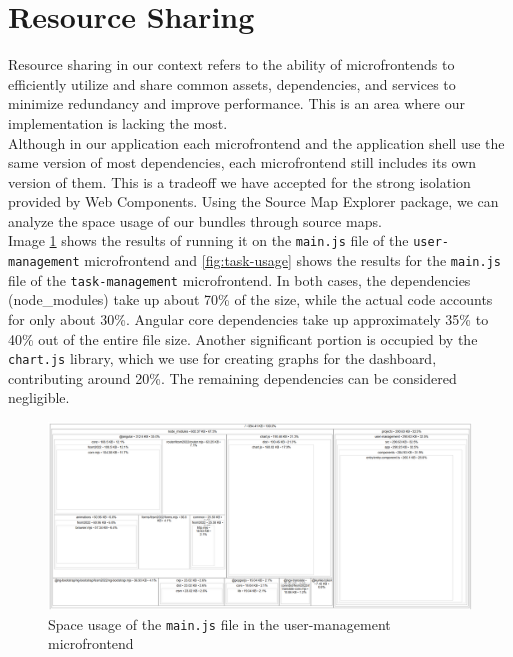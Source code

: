 \section{Resource Sharing}
Resource sharing in our context refers to the ability of microfrontends to efficiently utilize and share common assets, dependencies, and services to minimize redundancy and improve performance. This is an area where our implementation is lacking the most. \\

\noindent
Although in our application each microfrontend and the application shell use the same version of most dependencies, each microfrontend still includes its own version of them. This is a tradeoff we have accepted for the strong isolation provided by Web Components. Using the Source Map Explorer package, we can analyze the space usage of our bundles through source maps. \\

\noindent
Image \ref{fig:user-usage} shows the results of running it on the \texttt{main.js} file of the \texttt{user-management} microfrontend and \ref{fig:task-usage} shows the results for the \texttt{main.js} file of the \texttt{task-management} microfrontend. In both cases, the dependencies (node\_modules) take up about 70\% of the size, while the actual code accounts for only about 30\%. Angular core dependencies take up approximately 35\% to 40\% out of the entire file size. Another significant portion is occupied by the \texttt{chart.js} library, which we use for creating graphs for the dashboard, contributing around 20\%. The remaining dependencies can be considered negligible. \\
\begin{figure}[h]
    \centerline{\includegraphics[width=1\textwidth]{images/user-space-usage.png}}
    \caption[Space usage of the user-management microfrontend]{Space usage of the \texttt{main.js} file in the user-management microfrontend}
    \label{fig:user-usage} 
\end{figure}

